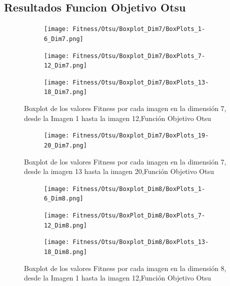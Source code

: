 \documentclass[conference]{IEEEtran}
\begin{document}
\subsection{Resultados Funcion Objetivo Otsu}
\begin{figure}
    \centering

    \begin{subfigure}{0.5\textwidth}
        \texttt{[image: Fitness/Otsu/Boxplot\_Dim7/BoxPlots\_1-6\_Dim7.png]}
    \end{subfigure}
    
    \begin{subfigure}{0.5\textwidth}
        \texttt{[image: Fitness/Otsu/Boxplot\_Dim7/BoxPlots\_7-12\_Dim7.png]}
    \end{subfigure}
         \begin{subfigure}{0.5\textwidth}
        \texttt{[image: Fitness/Otsu/Boxplot\_Dim7/BoxPlots\_13-18\_Dim7.png]}
    \end{subfigure}
    \caption{Boxplot de los valores Fitness por cada imagen en la dimensión 7, desde la Imagen 1 hasta la imagen 12,Función Objetivo Otsu}
\label{fig:imagenes}    
\end{figure}

\begin{figure}
    \centering
    \begin{subfigure}{0.5\textwidth}
        \texttt{[image: Fitness/Otsu/Boxplot\_Dim7/BoxPlots\_19-20\_Dim7.png]}
        \vspace{-150pt} %
    \end{subfigure}
    \caption{Boxplot de los valores Fitness por cada imagen en la dimensión 7, desde la imagen 13 hasta la imagen 20,Función Objetivo Otsu}
    \label{fig:imagenes}    
\end{figure}

\begin{figure}
    \centering

    \begin{subfigure}{0.5\textwidth}
        \texttt{[image: Fitness/Otsu/Boxplot\_Dim8/BoxPlots\_1-6\_Dim8.png]}
    \end{subfigure}
    
    \begin{subfigure}{0.5\textwidth}
        \texttt{[image: Fitness/Otsu/BoxPlot\_Dim8/BoxPlots\_7-12\_Dim8.png]}
    \end{subfigure}
         \begin{subfigure}{0.5\textwidth}
        \texttt{[image: Fitness/Otsu/Boxplot\_Dim8/BoxPlots\_13-18\_Dim8.png]}
    \end{subfigure}
    \caption{Boxplot de los valores Fitness por cada imagen en la dimensión 8, desde la Imagen 1 hasta la imagen 12,Función Objetivo Otsu}
\label{fig:imagenes}    
\end{figure}
\end{document}
